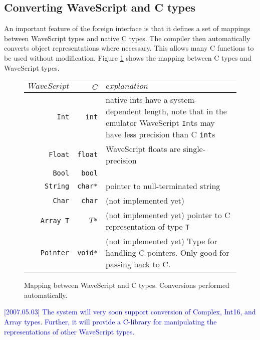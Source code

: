 \documentclass[twocolumn]{report}
\newcommand{\rednote}[1]{{\textcolor{blue}{#1}}}
\begin{document}
\subsection{Converting WaveScript and C types}

An important feature of the foreign interface is that it defines a set
of mappings between WaveScript types and native C types.  The compiler
then automatically converts object representations where necessary.
This allows many C functions to be used without modification.  Figure
\ref{f:types} shows the mapping between C types and WaveScript types.

\begin{figure}
\begin{center}
\begin{tabular}{|r|r|l|}
\hline
$WaveScript$ & $C$ & $explanation$\\
\hline
{\tt Int}   & {\tt int}   & 
  \parbox[t]{2.2in}{native ints have a system-dependent 
length, note that in the emulator WaveScript {\tt Int}s may 
have less precision than C {\tt int}s} \\

{\tt Float} & {\tt float} & 
\parbox[t]{2.2in}{WaveScript floats are single-precision}\\

{\tt Bool} & {\tt bool} & \\

{\tt String} & {\tt char*} & pointer to null-terminated string \\


{\tt Char} & {\tt char} & (not implemented yet) \\

{\tt Array T} & {\tt $T$*} & \parbox[t]{2.2in}{
(not implemented yet) 
pointer to C representation of type {\tt T} 
}\\

{\tt Pointer} & {\tt void*} &  \parbox[t]{2.2in}{
(not implemented yet) Type for handling C-pointers.  Only good for
  passing back to C.
}\\

\hline
\end{tabular}
\end{center}
\caption{Mapping between WaveScript and C types.  Conversions
  performed automatically.}
\label{f:types}
\end{figure}

\rednote{[2007.05.03] The system will very soon support conversion of
  Complex, Int16, and Array types.  Further, it will provide a
  C-library for manipulating the representations of other WaveScript types.}
\end{document}
